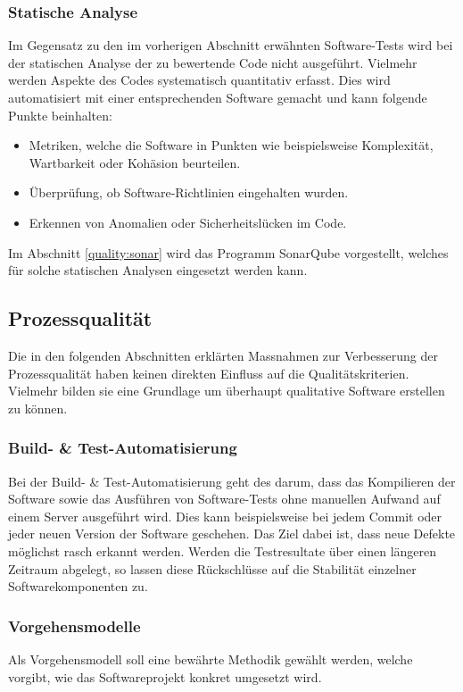 \subsubsection{Statische Analyse}
Im Gegensatz zu den im vorherigen Abschnitt erwähnten Software-Tests wird bei der statischen Analyse der zu bewertende Code nicht ausgeführt.
Vielmehr werden Aspekte des Codes systematisch quantitativ erfasst.
Dies wird automatisiert mit einer entsprechenden Software gemacht und kann folgende Punkte beinhalten:
\begin{itemize}
   \item Metriken, welche die Software in Punkten wie beispielsweise Komplexität, Wartbarkeit oder Kohäsion beurteilen.
   \item Überprüfung, ob Software-Richtlinien eingehalten wurden.
   \item Erkennen von Anomalien oder Sicherheitslücken im Code.
\end{itemize}

Im Abschnitt \ref{quality:sonar} wird das Programm SonarQube vorgestellt, welches für solche statischen Analysen eingesetzt werden kann.

\subsection{Prozessqualität}
Die in den folgenden Abschnitten erklärten Massnahmen zur Verbesserung der Prozessqualität haben keinen direkten Einfluss auf die Qualitätskriterien.
Vielmehr bilden sie eine Grundlage um überhaupt qualitative Software erstellen zu können.

\subsubsection{Build- \& Test-Automatisierung}
Bei der Build- \& Test-Automatisierung geht des darum, dass das Kompilieren der Software sowie das Ausführen von Software-Tests ohne manuellen Aufwand auf einem Server ausgeführt wird.
Dies kann beispielsweise bei jedem Commit oder jeder neuen Version der Software geschehen.
Das Ziel dabei ist, dass neue Defekte möglichst rasch erkannt werden.
Werden die Testresultate über einen längeren Zeitraum abgelegt, so lassen diese Rückschlüsse auf die Stabilität einzelner Softwarekomponenten zu.

\subsubsection{Vorgehensmodelle}
Als Vorgehensmodell soll eine bewährte Methodik gewählt werden, welche vorgibt, wie das Softwareprojekt konkret umgesetzt wird.


